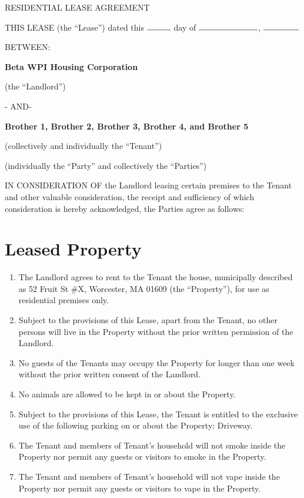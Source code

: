 \documentclass[12pt]{article}
\begin{document}
\begin{center}
RESIDENTIAL LEASE AGREEMENT
\end{center}

THIS LEASE (the ``Lease'') dated this $\rule{1cm}{0.15mm}$ day of
$\rule{2.5cm}{0.15mm}$, $\rule{1.5cm}{0.15mm}$

BETWEEN:\\

\begin{center}
\textbf{Beta WPI Housing Corporation}

(the ``Landlord'')

- AND-

\textbf{Brother 1, Brother 2, Brother 3, Brother 4, and Brother 5}

(collectively and individually the ``Tenant'')

(individually the ``Party'' and collectively the ``Parties'')
\end{center}

IN CONSIDERATION OF the Landlord leasing certain premises to the Tenant and
other valuable consideration, the receipt and sufficiency of which
consideration is hereby acknowledged, the Parties agree as follows:

\section*{Leased Property}

\begin{enumerate}

    \item The Landlord agrees to rent to the Tenant the house, municipally
	    described as 52 Fruit St \#X, Worcester, MA 01609 (the ``Property''),
		for use as residential premises only.  
    \item Subject to the provisions of this Lease, apart from the Tenant, no
	    other persons will live in the Property without the prior written
		permission of the Landlord.
    \item No guests of the Tenants may occupy the Property for longer than one
	    week without the prior written consent of the Landlord.
    \item No animals are allowed to be kept in or about the Property.
    \item Subject to the provisions of this Lease, the Tenant is entitled to
	    the exclusive use of the following parking on or about the
		Property: Driveway.
    \item The Tenant and members of Tenant's household will not smoke inside
	    the Property nor permit any guests or visitors to smoke in the
		Property.
    \item The Tenant and members of Tenant's household will not vape inside the
	    Property nor permit any guests or visitors to vape in the Property.

\end{enumerate}
    
\end{document}
